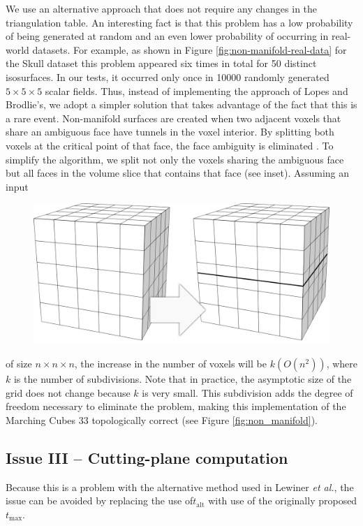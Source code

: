 We use an alternative approach that does not require any changes in the \mc{} triangulation table. An interesting fact is that this problem has a low probability of being generated at random and an even lower probability of occurring in real-world datasets. For example, as shown in Figure \ref{fig:non-manifold-real-data} for the Skull dataset this problem appeared six times in total for 50 distinct isosurfaces. In our tests, it occurred only once in 10000 randomly generated $5\times5\times5$ scalar fields. Thus, instead of implementing the approach of Lopes and Brodlie's, we adopt a simpler solution that takes advantage of the fact that this is a rare event.
%
Non-manifold surfaces are created when two adjacent voxels that share an ambiguous face have tunnels in the voxel interior. By splitting both voxels at the critical point of that face, the face ambiguity is  eliminated \cite{10.1109/TVCG.2009.10}.
To simplify the algorithm, we split not only the voxels sharing the ambiguous face but all faces in the volume slice that contains that face (see inset). Assuming an input
%
\begin{figure}
	\includegraphics[width=0.7\linewidth]{chapter4/figures/grid.png}
\end{figure}
%
of size $n \times n \times n$, the increase in the number of voxels will be $k(O(n^2))$, where $k$ is the number of subdivisions. Note that in practice, the asymptotic size of the grid does not change because $k$ is very small. This subdivision adds the degree of freedom necessary to eliminate the problem, making this implementation of the Marching Cubes 33 topologically correct (see Figure \ref{fig:non_manifold}). 


\subsection{Issue III -- Cutting-plane computation}

Because this is a problem with the alternative method used in Lewiner \emph{et al.}, the issue can be avoided by replacing the use of$t_{\mathrm{alt}}$ with use of the originally proposed $t_{\mathrm{max}}$.

